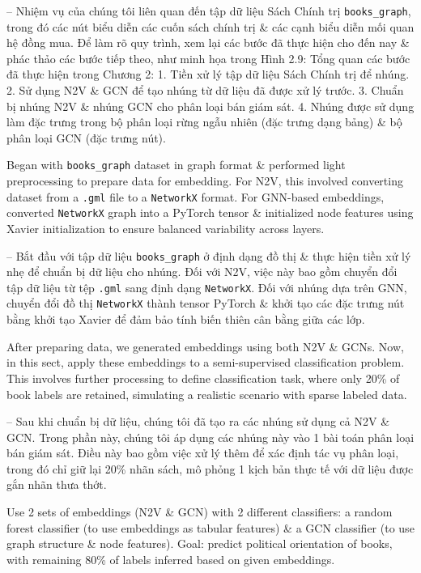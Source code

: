 \documentclass{article}
\begin{document}
\begin{itemize}
\begin{itemize}
       -- Nhiệm vụ của chúng tôi liên quan đến tập dữ liệu Sách Chính trị \verb|books_graph|, trong đó các nút biểu diễn các cuốn sách chính trị \& các cạnh biểu diễn mối quan hệ đồng mua. Để làm rõ quy trình, xem lại các bước đã thực hiện cho đến nay \& phác thảo các bước tiếp theo, như minh họa trong {\sf Hình 2.9: Tổng quan các bước đã thực hiện trong Chương 2: 1. Tiền xử lý tập dữ liệu Sách Chính trị để nhúng. 2. Sử dụng N2V \& GCN để tạo nhúng từ dữ liệu đã được xử lý trước. 3. Chuẩn bị nhúng N2V \& nhúng GCN cho phân loại bán giám sát. 4. Nhúng được sử dụng làm đặc trưng trong bộ phân loại rừng ngẫu nhiên (đặc trưng dạng bảng) \& bộ phân loại GCN (đặc trưng nút).}

       Began with \verb|books_graph| dataset in graph format \& performed light preprocessing to prepare data for embedding. For N2V, this involved converting dataset from a {\tt.gml} file to a {\tt NetworkX} format. For GNN-based embeddings, converted {\tt NetworkX} graph into a PyTorch tensor \& initialized node features using Xavier initialization to ensure balanced variability across layers.

       -- Bắt đầu với tập dữ liệu \verb|books_graph| ở định dạng đồ thị \& thực hiện tiền xử lý nhẹ để chuẩn bị dữ liệu cho nhúng. Đối với N2V, việc này bao gồm chuyển đổi tập dữ liệu từ tệp {\tt.gml} sang định dạng {\tt NetworkX}. Đối với nhúng dựa trên GNN, chuyển đổi đồ thị {\tt NetworkX} thành tensor PyTorch \& khởi tạo các đặc trưng nút bằng khởi tạo Xavier để đảm bảo tính biến thiên cân bằng giữa các lớp.

       After preparing data, we generated embeddings using both N2V \& GCNs. Now, in this sect, apply these embeddings to a semi-supervised classification problem. This involves further processing to define classification task, where only 20\% of book labels are retained, simulating a realistic scenario with sparse labeled data.

       -- Sau khi chuẩn bị dữ liệu, chúng tôi đã tạo ra các nhúng sử dụng cả N2V \& GCN. Trong phần này, chúng tôi áp dụng các nhúng này vào 1 bài toán phân loại bán giám sát. Điều này bao gồm việc xử lý thêm để xác định tác vụ phân loại, trong đó chỉ giữ lại 20\% nhãn sách, mô phỏng 1 kịch bản thực tế với dữ liệu được gắn nhãn thưa thớt.

       Use 2 sets of embeddings (N2V \& GCN) with 2 different classifiers: a random forest classifier (to use embeddings as tabular features) \& a GCN classifier (to use graph structure \& node features). Goal: predict political orientation of books, with remaining 80\% of labels inferred based on given embeddings.


\end{itemize}
\end{itemize}
\end{document}

